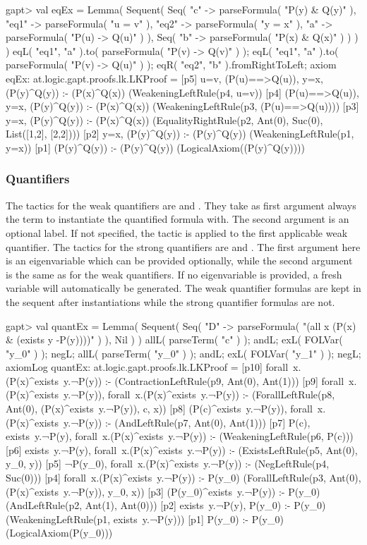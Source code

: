 \documentclass{article}
\newcommand{\cli}[1]{{\ttfamily {#1}}}
\begin{document}
\begin{clilisting}
gapt> val eqEx = Lemma( Sequent( Seq( "c" -> parseFormula( "P(y) & Q(y)" ), "eq1" -> parseFormula( "u = v" ), "eq2" -> parseFormula( "y = x" ), "a" -> parseFormula( "P(u) -> Q(u)" ) ), Seq( "b" -> parseFormula( "P(x) & Q(x)" ) ) ) ) {       eqL( "eq1", "a" ).to( parseFormula( "P(v) -> Q(v)" ) ); eqL( "eq1", "a" ).to( parseFormula( "P(v) -> Q(u)" ) ); eqR( "eq2", "b" ).fromRightToLeft; axiom }
eqEx: at.logic.gapt.proofs.lk.LKProof =
[p5] u=v, (P(u)==>Q(u)), y=x, (P(y)^Q(y)) :- (P(x)^Q(x))    (WeakeningLeftRule(p4, u=v))
[p4] (P(u)==>Q(u)), y=x, (P(y)^Q(y)) :- (P(x)^Q(x))    (WeakeningLeftRule(p3, (P(u)==>Q(u))))
[p3] y=x, (P(y)^Q(y)) :- (P(x)^Q(x))    (EqualityRightRule(p2, Ant(0), Suc(0), List([1,2], [2,2])))
[p2] y=x, (P(y)^Q(y)) :- (P(y)^Q(y))    (WeakeningLeftRule(p1, y=x))
[p1] (P(y)^Q(y)) :- (P(y)^Q(y))    (LogicalAxiom((P(y)^Q(y))))
\end{clilisting}

\subsubsection*{Quantifiers}
The tactics for the weak quantifiers are \cli{allL} and \cli{exR}. They take as first argument always the term to instantiate the quantified formula with. The second argument is an optional label. If not specified, the tactic is applied to the first applicable weak quantifier. The tactics for the strong quantifiers are \cli{allR} and \cli{exL}. The first argument here is an eigenvariable which can be provided optionally, while the second argument is the same as for the weak quantifiers. If no eigenvariable is provided, a fresh variable will automatically be generated. The weak quantifier formulas are kept in the sequent after instantiations while the strong quantifier formulas are not. 

\begin{clilisting}
gapt> val quantEx = Lemma( Sequent( Seq( "D" -> parseFormula( "(all x (P(x) & (exists y -P(y))))" ) ), Nil ) ) { allL( parseTerm( "c" ) ); andL; exL( FOLVar( "y_0" ) ); negL; allL( parseTerm( "y_0" ) ); andL; exL( FOLVar( "y_1" ) ); negL; axiomLog }
quantEx: at.logic.gapt.proofs.lk.LKProof =
[p10] forall~x.(P(x)^exists~y.¬P(y)) :-     (ContractionLeftRule(p9, Ant(0), Ant(1)))
[p9] forall~x.(P(x)^exists~y.¬P(y)), forall~x.(P(x)^exists~y.¬P(y)) :-     (ForallLeftRule(p8, Ant(0), (P(x)^exists~y.¬P(y)), c, x))
[p8] (P(c)^exists~y.¬P(y)), forall~x.(P(x)^exists~y.¬P(y)) :-     (AndLeftRule(p7, Ant(0), Ant(1)))
[p7] P(c), exists~y.¬P(y), forall~x.(P(x)^exists~y.¬P(y)) :-     (WeakeningLeftRule(p6, P(c)))
[p6] exists~y.¬P(y), forall~x.(P(x)^exists~y.¬P(y)) :-     (ExistsLeftRule(p5, Ant(0), y_0, y))
[p5] ¬P(y_0), forall~x.(P(x)^exists~y.¬P(y)) :-     (NegLeftRule(p4, Suc(0)))
[p4] forall~x.(P(x)^exists~y.¬P(y)) :- P(y_0)    (ForallLeftRule(p3, Ant(0), (P(x)^exists~y.¬P(y)), y_0, x))
[p3] (P(y_0)^exists~y.¬P(y)) :- P(y_0)    (AndLeftRule(p2, Ant(1), Ant(0)))
[p2] exists~y.¬P(y), P(y_0) :- P(y_0)    (WeakeningLeftRule(p1, exists~y.¬P(y)))
[p1] P(y_0) :- P(y_0)    (LogicalAxiom(P(y_0)))
\end{clilisting}
\end{document}
